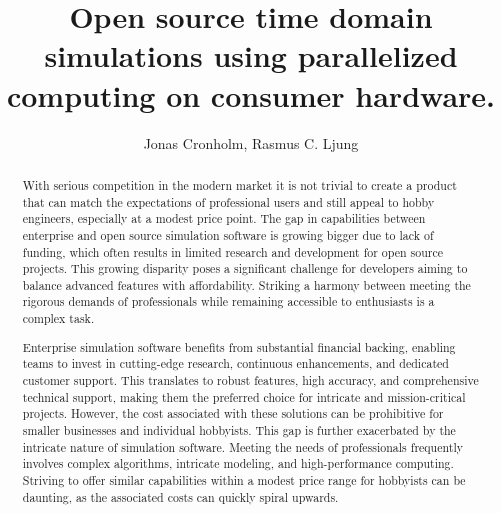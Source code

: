 \documentclass[11pt, a4paper, titlepage]{article}
\begin{document}
	\begin{titlepage}
		\title{Open source time domain simulations using parallelized computing on consumer hardware.}
		\author{Jonas Cronholm, Rasmus C. Ljung}
		\maketitle
		\newpage
	\end{titlepage}



\begin{abstract}
	
	
	With serious competition in the modern market it is not trivial to create a product that can match the expectations of professional users and still appeal to hobby engineers, especially at a modest price point. The gap in capabilities between enterprise and open source simulation software is growing bigger due to lack of funding, which often results in limited research and development for open source projects. This growing disparity poses a significant challenge for developers aiming to balance advanced features with affordability. Striking a harmony between meeting the rigorous demands of professionals while remaining accessible to enthusiasts is a complex task.
	
	Enterprise simulation software benefits from substantial financial backing, enabling teams to invest in cutting-edge research, continuous enhancements, and dedicated customer support. This translates to robust features, high accuracy, and comprehensive technical support, making them the preferred choice for intricate and mission-critical projects. However, the cost associated with these solutions can be prohibitive for smaller businesses and individual hobbyists. This gap is further exacerbated by the intricate nature of simulation software. Meeting the needs of professionals frequently involves complex algorithms, intricate modeling, and high-performance computing. Striving to offer similar capabilities within a modest price range for hobbyists can be daunting, as the associated costs can quickly spiral upwards.
	

\end{abstract}
\end{document}
